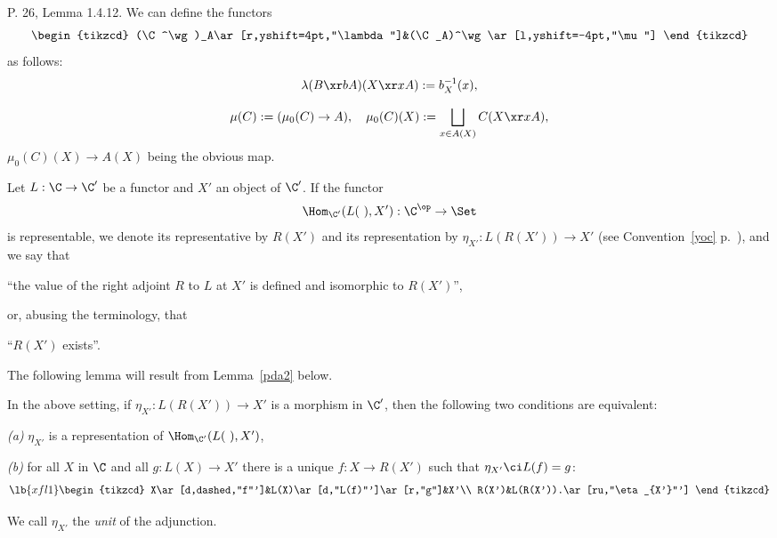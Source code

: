 \documentclass[12pt]{article}
\theoremstyle{remark}
\theoremstyle{definition}
\begin{document}
%

\begin{s}
P. 26, Lemma 1.4.12. We can define the functors
$$
\begin{tikzcd}
(\C^\wg)_A\ar[r,yshift=4pt,"\lambda"]&(\C_A)^\wg\ar[l,yshift=-4pt,"\mu"]
\end{tikzcd}
$$ 
as follows:
$$
\lambda(B\xr bA)(X\xr xA):=b_X^{-1}(x),
$$ 

$$
\mu(C):=(\mu_0(C)\to A),\quad\mu_0(C)(X):=\bigsqcup_{x\in A(X)}C(X\xr xA),
$$ 
$\mu_0(C)(X)\to A(X)$ being the obvious map.
\end{s}




\begin{s}
Let $L:\C\to\C'$ be a functor and $X'$ an object of $\C'$. If the functor 
$$
\Hom_{\C'}(L(\ ),X'):\C^{\op}\to\Set
$$ 
is representable, we denote its representative by $R(X')$ and its representation by $\eta_{X'}:L(R(X'))\to X'$ (see Convention~\ref{yoc} p.~), and we say that 

\nn``the value of the right adjoint $R$ to $L$ at $X'$ is defined and isomorphic to $R(X')$'', 

\nn or, abusing the terminology, that 

\nn``$R(X')$ exists''. 

The following lemma will result from Lemma~\ref{pda2} below. 

\begin{lem}
In the above setting, if $\eta_{X'}:L(R(X'))\to X'$ is a morphism in $\C'$, then the following two conditions are equivalent:

\nn\emph{(a)} $\eta_{X'}$ is a representation of $\Hom_{\C'}(L(\ ),X')$,

\nn\emph{(b)} for all $X$ in $\C$ and all $g:L(X)\to X'$ there is a unique $f:X\to R(X')$ such that $\eta_{X'}\ci L(f)=g$: 
\begin{equation}\lb{xfl1}
\begin{tikzcd}
X\ar[d,dashed,"f"']&L(X)\ar[d,"L(f)"']\ar[r,"g"]&X'\\ 
R(X')&L(R(X')).\ar[ru,"\eta_{X'}"']
\end{tikzcd}
\end{equation} 
\end{lem} 

We call $\eta_{X'}$ the \emph{unit} of the adjunction.
\end{s}
\end{document}
